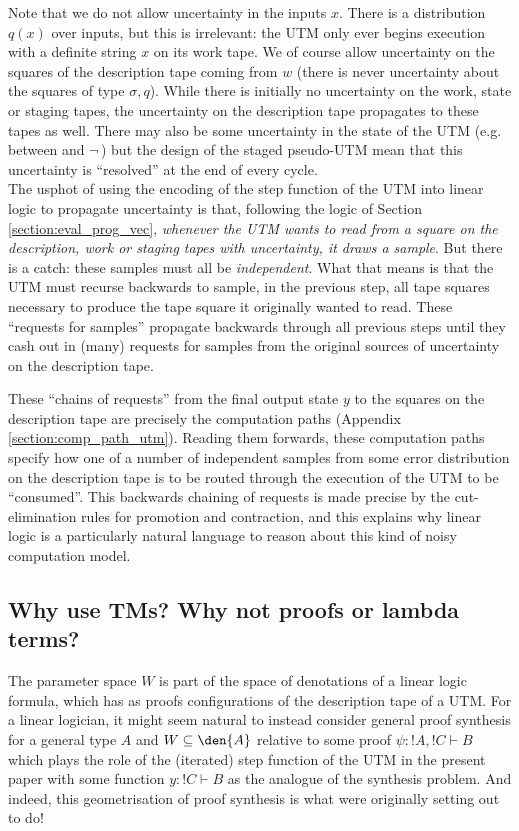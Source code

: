 \documentclass[english,letter paper,12pt,reqno]{article}
\theoremstyle{definition}
\begin{document}
Note that we do not allow uncertainty in the inputs $x$. There is a distribution $q(x)$ over inputs, but this is irrelevant: the UTM only ever begins execution with a definite string $x$ on its work tape. We of course allow uncertainty on the squares of the description tape coming from $w$ (there is never uncertainty about the squares of type $\sigma, q$). While there is initially no uncertainty on the work, state or staging tapes, the uncertainty on the description tape propagates to these tapes as well. There may also be some uncertainty in the state of the UTM (e.g. between  and $\neg\,$) but the design of the staged pseudo-UTM mean that this uncertainty is ``resolved'' at the end of every cycle.
\\

The usphot of using the encoding of the step function of the UTM into linear logic to propagate uncertainty is that, following the logic of Section \ref{section:eval_prog_vec}, \emph{whenever the UTM wants to read from a square on the description, work or staging tapes with uncertainty, it draws a sample}. But there is a catch: these samples must all be \emph{independent}. What that means is that the UTM must recurse backwards to sample, in the previous step, all tape squares necessary to produce the tape square it originally wanted to read. These ``requests for samples'' propagate backwards through all previous steps until they cash out in (many) requests for samples from the original sources of uncertainty on the description tape. 

These ``chains of requests'' from the final output state $y$ to the squares on the description tape are precisely the computation paths (Appendix \ref{section:comp_path_utm}). Reading them forwards, these computation paths specify how one of a number of independent samples from some error distribution on the description tape is to be routed through the execution of the UTM to be ``consumed''. This backwards chaining of requests is made precise by the cut-elimination rules for promotion and contraction, and this explains why linear logic is a particularly natural language to reason about this kind of noisy computation model.

\subsection{Why use TMs? Why not proofs or lambda terms?}

The parameter space $W$ is part of the space of denotations of a linear logic formula, which has as proofs configurations of the description tape of a UTM. For a linear logician, it might seem natural to instead consider general proof synthesis for a general type $A$ and $W \subseteq \den{A}$ relative to some proof $\psi: {!} A, {!} C \vdash B$ which plays the role of the (iterated) step function of the UTM in the present paper with some function $y: {!} C \vdash B$ as the analogue of the synthesis problem. And indeed, this geometrisation of proof synthesis is what \cite{clift2020encodings,clift2018derivatives} were originally setting out to do!
\end{document}
